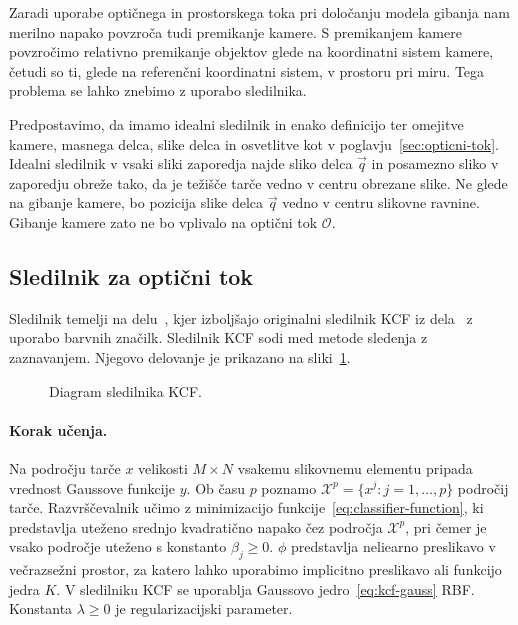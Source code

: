 Zaradi uporabe optičnega in prostorskega toka pri določanju modela gibanja nam merilno napako povzroča tudi premikanje kamere. S premikanjem kamere povzročimo relativno premikanje objektov glede na koordinatni sistem kamere, četudi so ti, glede na referenčni koordinatni sistem, v prostoru pri miru. Tega problema se lahko znebimo z uporabo sledilnika. 

Predpostavimo, da imamo idealni sledilnik in enako definicijo ter omejitve kamere, masnega delca, slike delca in osvetlitve kot v poglavju~\ref{sec:opticni-tok}. Idealni sledilnik v vsaki sliki zaporedja najde sliko delca $\vec{q}$ in posamezno sliko v zaporedju obreže tako, da je težišče tarče vedno v centru obrezane slike. Ne glede na gibanje kamere, bo pozicija slike delca $\vec{q}$ vedno v centru slikovne ravnine. Gibanje kamere zato ne bo vplivalo na optični tok $\mathcal{O}$.



\subsection{Sledilnik za optični tok} 
Sledilnik temelji na delu~\cite{danelljan2014adaptive}, kjer izboljšajo originalni sledilnik KCF iz dela~\cite{henriques2012exploiting} z uporabo barvnih značilk. Sledilnik KCF sodi med metode sledenja z zaznavanjem. Njegovo delovanje je prikazano na sliki~\ref{fig:diagram-kcf}.

\begin{figure}[htb]
	\centering
	\resizebox{\columnwidth}{!}{}
	\caption[Diagram sledilnika KCF]{Diagram sledilnika KCF.}
	\label{fig:diagram-kcf}
\end{figure}


\paragraph{Korak učenja.}
Na področju tarče $x$ velikosti $M \times N$ vsakemu slikovnemu elementu pripada vrednost Gaussove funkcije $y$. Ob času $p$ poznamo \hbox{$\mathcal{X}^p = \{x^j: j=1,\ldots,p\}$} področij tarče. Razvrščevalnik učimo z minimizacijo funkcije~\eqref{eq:classifier-function}, ki predstavlja uteženo srednjo kvadratično napako čez področja $\mathcal{X}^p$, pri čemer je vsako področje uteženo s konstanto $\beta_j \geq 0$. $\phi$ predstavlja neliearno preslikavo v večrazsežni prostor, za katero lahko uporabimo implicitno preslikavo ali funkcijo jedra $K$. V sledilniku KCF se uporablja Gaussovo jedro~\eqref{eq:kcf-gauss} RBF. Konstanta $\lambda \geq 0$ je regularizacijski parameter.

